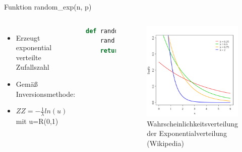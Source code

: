 \begin{frame}[fragile]{Funktion random\_exp(n, p)}
  \begin{columns}
    \begin{itemize}
  	\item Erzeugt exponential verteilte Zufallszahl
  	\item Gemäß Inversionsmethode:
  	\item $ZZ = -\frac{1}{\lambda} ln(u)$ mit u=R(0,1)
  \end{itemize}
  \begin{lstlisting}[language=python]
def random_exp(lambd):
    rand = random.random()
    return -(1/lambd) * log(rand)
\end{lstlisting}
\logopythonbottom
    	\begin{figure}[h!]
    	\includegraphics[scale=0.3]{lib_random_exp_wahrscheinlichkeitsverteilung.png}
  			\caption{Wahrscheinlichkeitsverteilung der Exponentialverteilung \tiny{(Wikipedia)}}
		\end{figure}
  \end{columns}
\end{frame}	